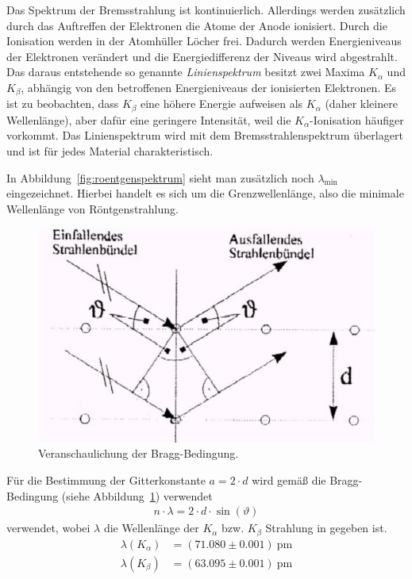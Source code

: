 \documentclass{article}
\begin{document}
Das Spektrum der Bremsstrahlung ist kontinuierlich. Allerdings werden zusätzlich durch das Auftreffen der Elektronen die Atome der Anode ionisiert. Durch die Ionisation werden in der Atomhüller Löcher frei. Dadurch werden Energieniveaus der Elektronen verändert und die Energiedifferenz der Niveaus wird abgestrahlt. Das daraus entstehende so genannte \textit{Linienspektrum} besitzt zwei Maxima $K_\alpha$ und $K_\beta$, abhängig von den betroffenen Energieniveaus der ionisierten Elektronen. Es ist zu beobachten, dass $K_\beta$ eine höhere Energie aufweisen als $K_\alpha$ (daher kleinere Wellenlänge), aber dafür eine geringere Intensität, weil die $K_\alpha$-Ionisation häufiger vorkommt. Das Linienspektrum wird mit dem Bremsstrahlenspektrum überlagert und ist für jedes Material charakteristisch.


In Abbildung~\ref{fig:roentgenspektrum} sieht man zusätzlich noch $\lambda_{\min}$ eingezeichnet. Hierbei handelt es sich um die Grenzwellenlänge, also die minimale Wellenlänge von Röntgenstrahlung.



\begin{figure}[H]
\includegraphics[scale=1.5]{bragg.png}
\caption{Veranschaulichung der Bragg-Bedingung.}
\label{fig:bragg}
\end{figure}


Für die Bestimmung der Gitterkonstante $a=2\cdot d$ wird gemäß \cite{moodle} die Bragg-Bedingung (siehe Abbildung~\ref{fig:bragg}) verwendet
\begin{align}
\label{eq:bragg}
n\cdot \lambda = 2\cdot d \cdot \sin(\vartheta)
\end{align}
verwendet, wobei $\lambda$ die Wellenlänge der $K_{\alpha}$ bzw. $K_{\beta}$ Strahlung in \cite{moodle} gegeben ist.
\begin{align}
\lambda(K_\alpha) &= (71.080 \pm 0.001)~\text{pm} \\
\lambda(K_\beta) &= (63.095 \pm 0.001)~\text{pm} 
\end{align}
\end{document}
